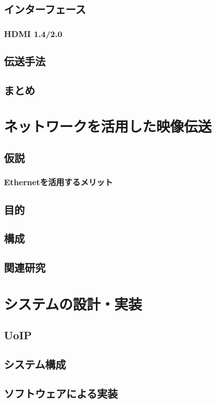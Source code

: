 \section{インターフェース}
\subsection{HDMI 1.4/2.0}
\section{伝送手法}
\section{まとめ}

\chapter{ネットワークを活用した映像伝送}
\label{chap:network-transmission}
\section{仮説}
\subsection{Ethernetを活用するメリット}
\section{目的}
\section{構成}
\section{関連研究}

\chapter{システムの設計・実装}
\label{chap:implementation}
\section{UoIP} %
\section{システム構成}
\section{ソフトウェアによる実装}
